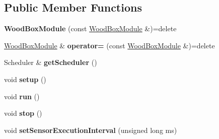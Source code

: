 \subsection*{Public Member Functions}
\begin{DoxyCompactItemize}
\item 
\mbox{\label{classwood_box_1_1module_1_1_wood_box_module_ade3d82ff1e508da2ad37185c208f9333}} 
{\bfseries Wood\+Box\+Module} (const \mbox{\hyperlink{classwood_box_1_1module_1_1_wood_box_module}{Wood\+Box\+Module}} \&)=delete
\item 
\mbox{\label{classwood_box_1_1module_1_1_wood_box_module_acdae18f8e9e685cdbce5a4fc99956ab3}} 
\mbox{\hyperlink{classwood_box_1_1module_1_1_wood_box_module}{Wood\+Box\+Module}} \& {\bfseries operator=} (const \mbox{\hyperlink{classwood_box_1_1module_1_1_wood_box_module}{Wood\+Box\+Module}} \&)=delete
\item 
\mbox{\label{classwood_box_1_1module_1_1_wood_box_module_a24b14dd95e7b1c5a7ba31107cd0c524d}} 
Scheduler \& {\bfseries get\+Scheduler} ()
\item 
\mbox{\label{classwood_box_1_1module_1_1_wood_box_module_a610b2339bd0ff26d2cde59d2006a4aed}} 
void {\bfseries setup} ()
\item 
\mbox{\label{classwood_box_1_1module_1_1_wood_box_module_ac65e58ab2338b1e3f57e4ce5d9e70c6c}} 
void {\bfseries run} ()
\item 
\mbox{\label{classwood_box_1_1module_1_1_wood_box_module_abbc32e89fe1ace40f447539237c0b713}} 
void {\bfseries stop} ()
\item 
\mbox{\label{classwood_box_1_1module_1_1_wood_box_module_aa5e44c8631ee30e85c16ffc0454c8210}} 
void {\bfseries set\+Sensor\+Execution\+Interval} (unsigned long ms)
\item 
\mbox{\label{classwood_box_1_1module_1_1_wood_box_module_a0242f49765460d7c1e0528260ba1c26e}} 

\end{DoxyCompactItemize}
